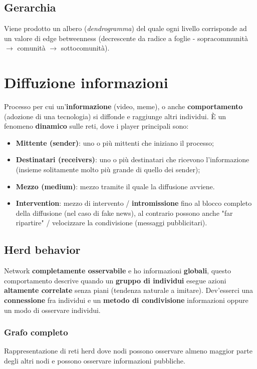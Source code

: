 \documentclass{article}
\begin{document}
  \subsection{Gerarchia}
    Viene prodotto un albero (\textit{dendrogramma}) del quale ogni livello corrisponde ad un valore di edge betweenness (decrescente da radice a foglie - sopracommunità $\rightarrow$ comunità $\rightarrow$ sottocomunità).
\section{Diffuzione informazioni}
  Processo per cui un'\textbf{informazione} (video, meme), o anche \textbf{comportamento} (adozione di una tecnologia) si diffonde e raggiunge altri individui. È un fenomeno \textbf{dinamico} sulle reti, dove i player principali sono:
  \begin{itemize}
      \item \textbf{Mittente (sender)}: uno o più mittenti che iniziano il processo;
      \item \textbf{Destinatari (receivers)}: uno o più destinatari che ricevono l'informazione (insieme solitamente molto più grande di quello dei sender);
      \item \textbf{Mezzo (medium)}: mezzo tramite il quale la diffusione avviene.
      \item \textbf{Intervention}: mezzo di intervento / \textbf{intromissione} fino al blocco completo della diffusione (nel caso di fake news), al contrario possono anche "far ripartire" / velocizzare la condivisione (messaggi pubblicitari).
  \end{itemize}
  \subsection{Herd behavior}
    Network \textbf{completamente osservabile} e ho informazioni \textbf{globali}, questo comportamento descrive quando un \textbf{gruppo di individui} esegue azioni \textbf{altamente correlate} senza piani (tendenza naturale a imitare). Dev'esserci una \textbf{connessione} fra individui e un \textbf{metodo di condivisione} informazioni oppure un modo di osservare individui.
    \subsubsection{Grafo completo}
      Rappresentazione di reti herd dove nodi possono osservare almeno maggior parte degli altri nodi e possono osservare informazioni pubbliche.
\end{document}
